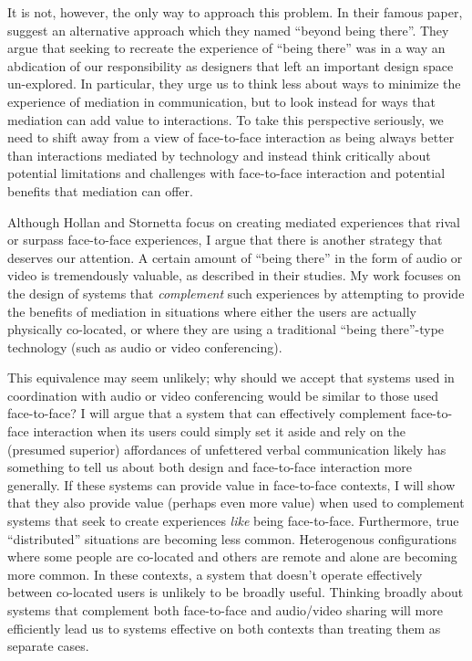 It is not, however, the only way to approach this problem. In their famous paper, \citet{Hollan:1992tz} suggest an alternative approach which they named ``beyond being there''. They argue that seeking to recreate the experience of ``being there'' was in a way an abdication of our responsibility as designers that left an important design space un-explored. In particular, they urge us to think less about ways to minimize the experience of mediation in communication, but to look instead for ways that mediation can add value to interactions. To take this perspective seriously, we need to shift away from a view of face-to-face interaction as being always better than interactions mediated by technology and instead think critically about potential limitations and challenges with face-to-face interaction and potential benefits that mediation can offer. 

Although Hollan and Stornetta focus on creating mediated experiences that rival or surpass face-to-face experiences, I argue that there is another  strategy that deserves our attention. A certain amount of ``being there'' in the form of audio or video is tremendously valuable, as \citet{Ochsman:1974vu} described in their studies. My work focuses on the design of systems that \emph{complement} such experiences by attempting to provide the benefits of mediation in situations where either the users are actually physically co-located, or where they are using a traditional ``being there''-type technology (such as audio or video conferencing).

This equivalence may seem unlikely; why should we accept that systems used in coordination with audio or video conferencing would be similar to those used face-to-face? I will argue that a system that can effectively complement face-to-face interaction when its users could simply set it aside and rely on the (presumed superior) affordances of unfettered verbal communication likely has something to tell us about both design and face-to-face interaction more generally. If these systems can provide value in face-to-face contexts, I will show that they also provide value (perhaps even more value) when used to complement systems that seek to create experiences \emph{like} being face-to-face. Furthermore, true ``distributed'' situations are becoming less common. Heterogenous configurations where some people are co-located and others are remote and alone are becoming more common. In these contexts, a system that doesn't operate effectively between co-located users is unlikely to be broadly useful. Thinking broadly about systems that complement both face-to-face and audio/video sharing will more efficiently lead us to systems effective on both contexts than treating them as separate cases.



